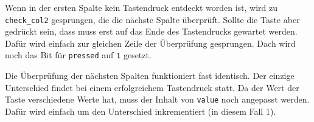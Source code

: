 \begin{Shaded}
\begin{Highlighting}[]
     

     \DecValTok{$}

     
\end{Highlighting}
\end{Shaded}

Wenn in der ersten Spalte kein Tastendruck entdeckt worden ist, wird zu
\texttt{check\_col2} gesprungen, die die nächste Spalte überprüft.
Sollte die Taste aber gedrückt sein, dass muss erst auf das Ende des
Tastendrucks gewartet werden. Dafür wird einfach zur gleichen Zeile der
Überprüfung gesprungen. Dach wird noch das Bit für \texttt{pressed} auf
\texttt{1} gesetzt.

\begin{Shaded}
\begin{Highlighting}[]
     
     \DecValTok{$}
     
     
\end{Highlighting}
\end{Shaded}

Die Überprüfung der nächsten Spalten funktioniert fast identisch. Der
einzige Unterschied findet bei einem erfolgreichem Tastendruck statt. Da
der Wert der Taste verschiedene Werte hat, muss der Inhalt von
\texttt{value} noch angepasst werden. Dafür wird einfach um den
Unterschied inkrementiert (in diesem Fall 1).

\begin{Shaded}
\begin{Highlighting}[]
     
     

     
     

     
     

     
     

\end{Highlighting}
\end{Shaded}

